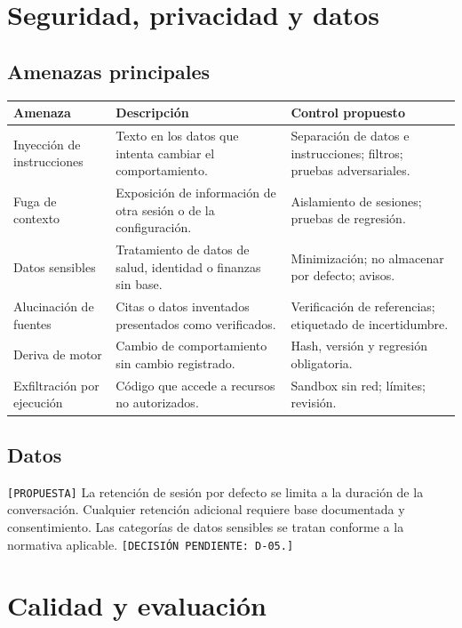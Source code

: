 \documentclass[12pt]{article}
\begin{document}
\section{Seguridad, privacidad y datos}

\subsection{Amenazas principales}

\begin{longtable}{|p{3.8cm}|p{5.0cm}|p{5.2cm}|}
\hline
\textbf{Amenaza} & \textbf{Descripción} & \textbf{Control propuesto} \\
\hline
\endhead
Inyección de instrucciones & Texto en los datos que intenta cambiar el comportamiento. & Separación de datos e instrucciones; filtros; pruebas adversariales. \\
\hline
Fuga de contexto & Exposición de información de otra sesión o de la configuración. & Aislamiento de sesiones; pruebas de regresión. \\
\hline
Datos sensibles & Tratamiento de datos de salud, identidad o finanzas sin base. & Minimización; no almacenar por defecto; avisos. \\
\hline
Alucinación de fuentes & Citas o datos inventados presentados como verificados. & Verificación de referencias; etiquetado de incertidumbre. \\
\hline
Deriva de motor & Cambio de comportamiento sin cambio registrado. & Hash, versión y regresión obligatoria. \\
\hline
Exfiltración por ejecución & Código que accede a recursos no autorizados. & Sandbox sin red; límites; revisión. \\
\hline
\end{longtable}

\subsection{Datos}

\texttt{[PROPUESTA]} La retención de sesión por defecto se limita a la
duración de la conversación. Cualquier retención adicional requiere base
documentada y consentimiento. Las categorías de datos sensibles se tratan
conforme a la normativa aplicable. \texttt{[DECISIÓN PENDIENTE: D-05.]}

\section{Calidad y evaluación}
\end{document}
